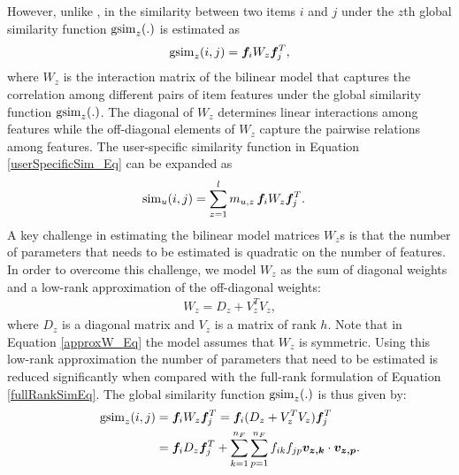 However, unlike \CFLIN, in \CF the similarity between two items $i$ and $j$ under the $z$th global similarity function $\operatorname{gsim}_z(.)$ is estimated as
%
\begin{equation} \label{fullRankSimEq}
  \begin{split}
    \operatorname{gsim}_z(i,j) = \bm{f}_i W_z \bm{f}_j^T,
  \end{split}
\end{equation}
\noindent where $W_z$ is the interaction matrix of the bilinear model that captures the 
correlation among different pairs of
item features under the global similarity function $\operatorname{gsim}_z(.)$. 
The diagonal of $W_z$ determines linear interactions among features
while the off-diagonal elements of $W_z$ capture the pairwise relations among
features. The user-specific similarity function in Equation \ref{userSpecificSim_Eq}
can be expanded as 
%
\begin{equation} \label{userSpecificSimExp_Eq}
  \begin{split}
    \operatorname{sim}_{u}(i,j) &= \sum_{z=1}^{l} m_{u,z} \, \bm{f}_i W_z \bm{f}_j^T. 
  \end{split}
\end{equation}
%
A key challenge in estimating the bilinear model matrices $W_z$s is that the number
of parameters that needs to be estimated is quadratic on the number of features.
In order to overcome this challenge, 
we model $W_z$ as the sum of diagonal weights and a low-rank approximation of the off-diagonal weights:
%
\begin{equation}\label{approxW_Eq}
  \begin{split}
    W_z = D_z + V_z^TV_z,
  \end{split}
\end{equation}
%
\noindent where $D_z$ is a diagonal matrix and $V_z$ is a matrix of rank $h$.
Note that in Equation \ref{approxW_Eq} the model assumes that $W_z$ is
symmetric. %
Using this low-rank approximation the number of parameters that need to be 
estimated is reduced significantly when compared with the full-rank formulation 
of Equation \ref{fullRankSimEq}.
The global similarity
function $\operatorname{gsim}_z(.)$ is thus given by:
%
\begin{equation}\label{simEq}
\begin{split}
  \operatorname{gsim}_z(i,j)  & = \bm{f}_iW_z\bm{f}_j^T = \bm{f}_i(D_z + V_z^TV_z)\bm{f}_j^T\\
   &= \bm{f}_i D_z \bm{f}_j^T  + \sum_{k=1}^{n_F}\sum_{\substack{p=1}}^{n_F} f_{ik}f_{jp}\bm{v_{z,k}} \cdot  \bm{v_{z,p}}. \\
\end{split}
\end{equation}
%

